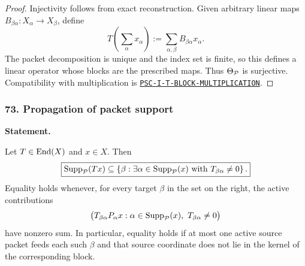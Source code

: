 \begin{proof}
Injectivity follows from exact reconstruction.  Given arbitrary linear maps $B_{\beta\alpha}:X_\alpha\to X_\beta$, define
\[
T\left(\sum_\alpha x_\alpha\right)
:=
\sum_{\alpha,\beta}B_{\beta\alpha}x_\alpha.
\]
The packet decomposition is unique and the index set is finite, so this defines a linear operator whose blocks are the prescribed maps.  Thus $\Theta_{\mathcal P}$ is surjective.  Compatibility with multiplication is \hyperref[rec:PSC-I-T-BLOCK-MULTIPLICATION]{\nolinkurl{PSC-I-T-BLOCK-MULTIPLICATION}}.
\end{proof}
\subsubsection*{73. Propagation of packet support}
\label{rec:PSC-I-C-PACKET-SUPPORT-PROPAGATION}
\textbf{Statement.}\par
Let \(T\in\operatorname{End}(X)\) and \(x\in X\).  Then
\[
\boxed{
\operatorname{Supp}_{\mathcal P}(Tx)
\subseteq
\left\{\beta:\exists\alpha\in\operatorname{Supp}_{\mathcal P}(x)
\text{ with }T_{\beta\alpha}\neq0\right\}.
}
\]
Equality holds whenever, for every target \(\beta\) in the set on the right, the active contributions
\[
\bigl(T_{\beta\alpha}P_\alpha x:
\alpha\in\operatorname{Supp}_{\mathcal P}(x),\ T_{\beta\alpha}\neq0\bigr)
\]
have nonzero sum.  In particular, equality holds if at most one active source packet feeds each such \(\beta\) and that source coordinate does not lie in the kernel of the corresponding block.

